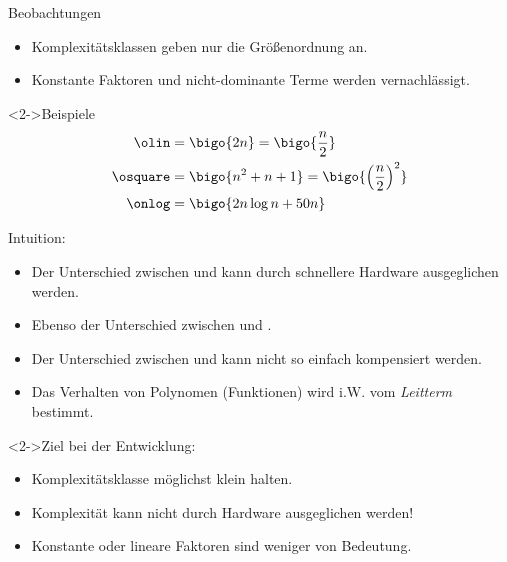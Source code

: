\begin{frame}
    \begin{block}{Beobachtungen}
        \begin{itemize}
            \item Komplexitätsklassen geben nur die Größenordnung an.
            \item Konstante Faktoren und nicht-dominante Terme werden vernachlässigt.
        \end{itemize}
    \end{block}
    \begin{block}<2->{Beispiele}
        \vspace{-3ex}
        \begin{align*}
            \olin &= \bigo{2n} = \bigo{\frac{n}{2}} \\
            \osquare &= \bigo{n^2+n+1} = \bigo{\left(\frac{n}{2}\right)^2} \\
            \onlog &= \bigo{2n \log n  + 50n}
        \end{align*}
    \end{block}
\end{frame}

\begin{frame}
    \begin{block}{Intuition:}
        \begin{itemize}
            \item Der Unterschied zwischen \olin und  kann durch schnellere Hardware ausgeglichen werden.
            \item Ebenso der Unterschied zwischen \osquare und .
            \item Der Unterschied zwischen \olin und \osquare kann nicht so einfach kompensiert werden.
            \item Das Verhalten von Polynomen (Funktionen) wird i.W. vom \emph{Leitterm} bestimmt.
        \end{itemize}
    \end{block}
    \begin{block}<2->{Ziel bei der Entwicklung:}
        \begin{itemize}
            \item Komplexitätsklasse möglichst klein halten.
            \item \alert{Komplexität kann nicht durch Hardware ausgeglichen werden!}
            \item Konstante oder lineare Faktoren sind weniger von Bedeutung.
        \end{itemize}
    \end{block}
\end{frame}
    
